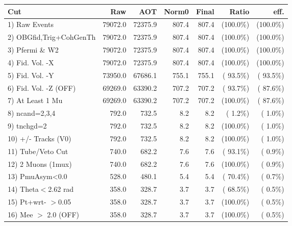  \begin{table}[h!]\centering
 \begin{tabular}{||l||r|r|r|r|r|r||}
 \hline
 \hline
 Cut & Raw & AOT & Norm0 & Final & Ratio & eff.       \\
 \hline
  1) Raw Events           &      79072.0 &      72375.9 &        807.4 &        807.4 & (100.0\%) & (100.0\%) \\
  2) OBGfid,Trig+CohGenTh &      79072.0 &      72375.9 &        807.4 &        807.4 & (100.0\%) & (100.0\%) \\
  3) Pfermi \& W2         &      79072.0 &      72375.9 &        807.4 &        807.4 & (100.0\%) & (100.0\%) \\
  4) Fid. Vol. -X         &      79072.0 &      72375.9 &        807.4 &        807.4 & (100.0\%) & (100.0\%) \\
  5) Fid. Vol. -Y         &      73950.0 &      67686.1 &        755.1 &        755.1 & ( 93.5\%) & ( 93.5\%) \\
  6) Fid. Vol. -Z (OFF)   &      69269.0 &      63390.2 &        707.2 &        707.2 & ( 93.7\%) & ( 87.6\%) \\
  7) At Least 1 Mu        &      69269.0 &      63390.2 &        707.2 &        707.2 & (100.0\%) & ( 87.6\%) \\
  8) ncand=2,3,4          &        792.0 &        732.5 &          8.2 &          8.2 & (  1.2\%) & (  1.0\%) \\
  9) tnchgd=2             &        792.0 &        732.5 &          8.2 &          8.2 & (100.0\%) & (  1.0\%) \\
 10) +/- Tracks (V0)      &        792.0 &        732.5 &          8.2 &          8.2 & (100.0\%) & (  1.0\%) \\
 11) Tube/Veto Cut        &        740.0 &        682.2 &          7.6 &          7.6 & ( 93.1\%) & (  0.9\%) \\
 12) 2 Muons (1mux)       &        740.0 &        682.2 &          7.6 &          7.6 & (100.0\%) & (  0.9\%) \\
 13) PmuAsym<0.0          &        528.0 &        480.1 &          5.4 &          5.4 & ( 70.4\%) & (  0.7\%) \\
 14) Theta$<$2.62 rad     &        358.0 &        328.7 &          3.7 &          3.7 & ( 68.5\%) & (  0.5\%) \\
 15) Pt+wrt- $>$0.05      &        358.0 &        328.7 &          3.7 &          3.7 & (100.0\%) & (  0.5\%) \\
 16) Mee $>$ 2.0  (OFF)   &        358.0 &        328.7 &          3.7 &          3.7 & (100.0\%) & (  0.5\%) \\

\end{tabular}
\end{table}
